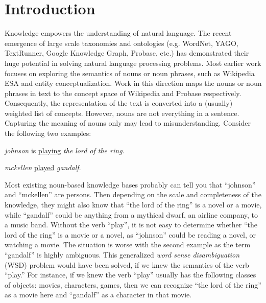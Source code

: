 \section{Introduction}

Knowledge empowers the understanding of natural language.
The recent emergence of large scale taxonomies and ontologies
(e.g. WordNet\cite{wordnet}, YAGO\cite{SuchanekKW07},
TextRunner\cite{BankoCSBE07},
Google Knowledge Graph\cite{singhal2012:gkg}, Probase\cite{WuLWZ12}, etc.)
has demonstrated their huge potential in solving natural language
processing problems.
Most earlier work focuses on exploring the semantics of nouns
or noun phrases, such as Wikipedia ESA\cite{GabrilovichM07:ESA} and
entity conceptualization\cite{Song11:Conceptualize}.
Work in this direction maps the nouns or noun phrases in text to the
concept space of Wikipedia and Probase respectively. Consequently,
the representation of the text is converted into a (usually) weighted
list of concepts.
However, nouns are not everything in a sentence.  Capturing the meaning
of nouns only may lead to misunderstanding. Consider the following two examples:
\begin{example}
\label{eg:entertain}
{\em johnson} is \underline{playing} {\em the lord of the ring}.
\end{example}
\begin{example}
\label{eg:performance}
{\em mckellen} \underline{played} {\em gandalf}.
\end{example}

Most existing noun-based knowledge bases probably can tell you
that ``johnson'' and ``mckellen'' are persons.
Then depending on
the scale and completeness of the knowledge, they might also know that
``the lord of the ring'' is a novel or a movie,
while ``gandalf'' could be anything from
a mythical dwarf, an airline company, to a music band.
Without the verb ``play'', it is not easy to determine whether ``the
lord of the ring'' is a movie or a novel, as ``johnson'' could be reading
a novel, or watching a movie.
The situation is worse with the second example as the term ``gandalf''
is highly ambiguous. This generalized {\em word sense disambiguation} (WSD)
problem would have been solved, if we knew
the semantics of the verb ``play.'' For instance, if we knew the verb ``play''
usually has the following classes of objects: movies, characters, games,
then we can recognize ``the lord of the ring'' as a movie here and ``gandalf''
as a character in that movie.


